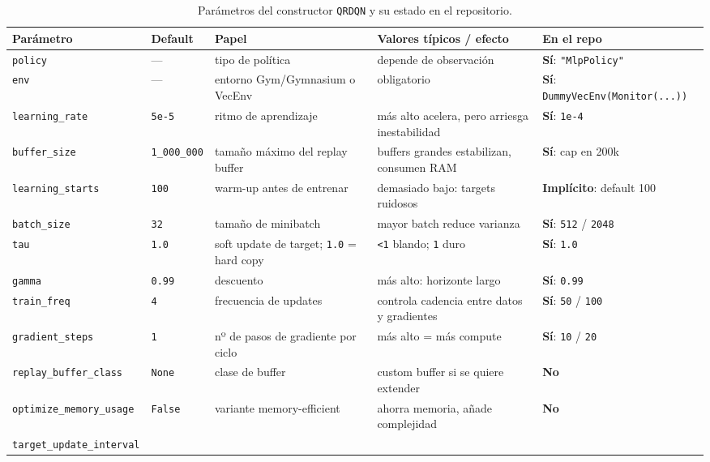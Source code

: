 ﻿\documentclass[12pt,a4paper]{article}
\begin{document}
\begin{table}[htbp]
\caption{Parámetros del constructor \texttt{QRDQN} y su estado en el repositorio.}
\scriptsize
\begin{tabular}{p{2.8cm}p{1.8cm}p{3cm}p{3.5cm}p{2.5cm}}
\hline
\textbf{Parámetro} & \textbf{Default} & \textbf{Papel} & \textbf{Valores típicos / efecto}
  & \textbf{En el repo} \\
\hline
\texttt{policy}
  & ---
  & tipo de política
  & depende de observación
  & \textbf{Sí}: \texttt{"MlpPolicy"} \\
\texttt{env}
  & ---
  & entorno Gym/Gymnasium o VecEnv
  & obligatorio
  & \textbf{Sí}: \texttt{DummyVecEnv(Monitor(...))} \\
\texttt{learning\_rate}
  & \texttt{5e-5}
  & ritmo de aprendizaje
  & más alto acelera, pero arriesga inestabilidad
  & \textbf{Sí}: \texttt{1e-4} \\
\texttt{buffer\_size}
  & \texttt{1\_000\_000}
  & tamaño máximo del replay buffer
  & buffers grandes estabilizan, consumen RAM
  & \textbf{Sí}: cap en 200k \\
\texttt{learning\_starts}
  & \texttt{100}
  & warm-up antes de entrenar
  & demasiado bajo: targets ruidosos
  & \textbf{Implícito}: default 100 \\
\texttt{batch\_size}
  & \texttt{32}
  & tamaño de minibatch
  & mayor batch reduce varianza
  & \textbf{Sí}: \texttt{512} / \texttt{2048} \\
\texttt{tau}
  & \texttt{1.0}
  & soft update de target; \texttt{1.0} = hard copy
  & \texttt{<1} blando; \texttt{1} duro
  & \textbf{Sí}: \texttt{1.0} \\
\texttt{gamma}
  & \texttt{0.99}
  & descuento
  & más alto: horizonte largo
  & \textbf{Sí}: \texttt{0.99} \\
\texttt{train\_freq}
  & \texttt{4}
  & frecuencia de updates
  & controla cadencia entre datos y gradientes
  & \textbf{Sí}: \texttt{50} / \texttt{100} \\
\texttt{gradient\_steps}
  & \texttt{1}
  & nº de pasos de gradiente por ciclo
  & más alto = más compute
  & \textbf{Sí}: \texttt{10} / \texttt{20} \\
\texttt{replay\_buffer\_class}
  & \texttt{None}
  & clase de buffer
  & custom buffer si se quiere extender
  & \textbf{No} \\
\texttt{optimize\_memory\_usage}
  & \texttt{False}
  & variante memory-efficient
  & ahorra memoria, añade complejidad
  & \textbf{No} \\
\texttt{target\_update\_interval}

\end{tabular}
\end{table}
\end{document}
